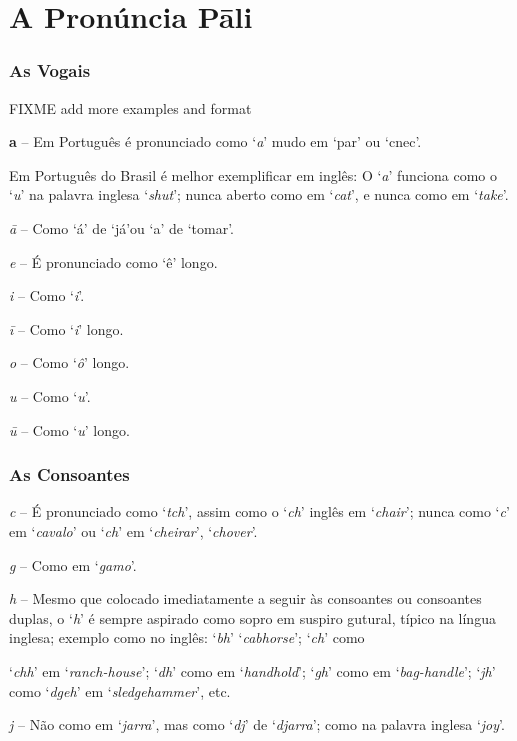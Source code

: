 \chapter{A Pronúncia Pāli}
\label{pron-pali}

\subsection{As Vogais}

FIXME add more examples and format

\textbf{a} -- Em Português é pronunciado como `\emph{a}' mudo em `par' ou `cnec'.

Em Português do Brasil é melhor exemplificar em inglês: O `\emph{a}' funciona como o `\emph{u}' na palavra inglesa `\emph{shut}'; nunca aberto como em `\emph{cat}', e nunca como em `\emph{take}'.

\emph{ā} -- Como `á' de `já'ou `a' de `tomar'.

\emph{e} -- É pronunciado como `ê' longo.

\emph{i} -- Como `\emph{i}'.

\emph{ī} -- Como `\emph{i}' longo.

\emph{o} -- Como `\emph{ô}' longo.

\emph{u} -- Como `\emph{u}'.

\emph{ū} -- Como `\emph{u}' longo.

\subsection{As Consoantes}

\emph{c} -- É pronunciado como `\emph{tch}', assim como o `\emph{ch}' inglês em `\emph{chair}'; nunca como `\emph{c}' em `\emph{cavalo}' ou `\emph{ch}' em `\emph{cheirar}', `\emph{chover}'.

\emph{g} -- Como em `\emph{gamo}'.

\emph{h} -- Mesmo que colocado imediatamente a seguir às consoantes ou consoantes duplas, o `\emph{h}' é sempre aspirado como sopro em suspiro gutural, típico na língua inglesa; exemplo como no inglês: `\emph{bh}' `\emph{cabhorse}'; `\emph{ch}' como

`\emph{chh}' em `\emph{ranch-house}'; `\emph{dh}' como em `\emph{handhold}'; `\emph{gh}' como em `\emph{bag-handle}'; `\emph{jh}' como `\emph{dgeh}' em `\emph{sledgehammer}', etc.

\emph{j} -- Não como em `\emph{jarra}', mas como `\emph{dj}' de `\emph{djarra}'; como na palavra inglesa `\emph{joy}'.

